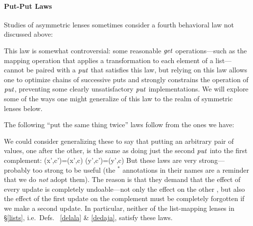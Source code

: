 \iffull
\paragraph*{Put-Put Laws}

Studies of asymmetric lenses sometimes consider a fourth behavioral law not
discussed above:


This law is somewhat controversial: some reasonable $\mathit{get}$
operations---such as the mapping operation that applies a transformation to
each element of a list---cannot be paired with a $\mathit{put}$ that satisfies this
law, but relying on this law allows one to optimize chains of successive
puts and strongly constrains the operation of $\mathit{put}$, preventing some
clearly unsatisfactory $\mathit{put}$ implementations. We will explore some of the
ways one might generalize of this law to the realm of symmetric lenses
below.

\begin{lemma} The following ``put the same thing twice'' laws follow from
the ones we have:
\end{lemma}

We could consider generalizing these to say that putting an arbitrary pair
of values, one after the other, is the same as doing just the second $\mathit{put}$
into the first complement:
{
 {\putr(x',c')=\putr(x',c)}
 {\putl(y',c')=\putl(y',c)}
}
%
But these laws are very strong---probably too strong to be useful (the
$^\ast$ annotations in their names are a reminder that we do {\em not} adopt
them).  The reason is that they demand that the effect of every update is
completely undoable---not only the effect on the other \replica, but also the
effect of the first update on the complement must be completely forgotten if
we make a second update.  In particular, neither of the list-mapping lenses
in \S\ref{lists}, i.e.\ Defs.~ \ref{delala} \& \ref{dedaja}, satisfy these laws.
\fi

